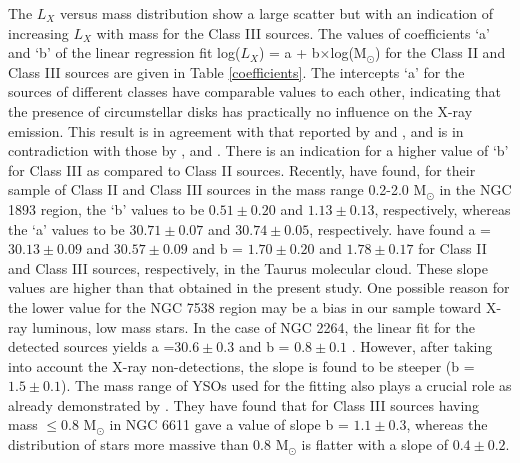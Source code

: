 \documentclass[a4paper,fleqn,usenatbib,useAMS]{mnras}
\begin{document}
The $L_X$ versus mass distribution show a large scatter but with  an indication of increasing  
$L_X$ with mass for the Class III sources.
The values of coefficients `a'  and `b'  of the linear regression fit log($L_X$) = a + b$\times$log(M$_\odot$) 
for the Class II and Class III sources are given in Table \ref{coefficients}.
The intercepts `a' for the sources of different classes have comparable
values to each other, indicating that the presence
of circumstellar disks has practically no influence on the X-ray emission.
This result is in agreement with that reported by \citet{2002ApJ...574..258F} and  \citet{2014NewA...29...18P}, 
and is in contradiction with  those by \citet{2001A&A...377..538S}, \citet{2005ApJS..160..401P} and \citet{2007A&A...468..425T}. 
There is  an indication for a higher value of `b' for Class III as compared to Class II sources.
Recently, \citet{2014NewA...29...18P} have found, for their sample of Class II and Class III sources in the mass range 0.2-2.0 M$_\odot$ in the NGC 1893 region,
the `b' values to be $0.51\pm0.20$ and $1.13\pm0.13$, 
respectively, whereas the `a' values to be  $30.71\pm0.07$ and $30.74\pm0.05$, 
respectively.
\citet{2007A&A...468..425T} have found a =  $30.13\pm0.09$ and  $30.57\pm0.09$ and b = $1.70\pm0.20$ and  $1.78\pm0.17$ 
for  Class II and Class III sources, respectively, in the Taurus molecular cloud. 
These slope values are higher than that obtained in the present study.
One possible reason for the lower value for the NGC 7538 region may be a bias in our
sample toward X-ray luminous, low mass stars. 
In the case of NGC 2264, the linear fit for the detected sources yields a =$30.6\pm0.3$ and b = $0.8\pm0.1$ \citep{2007AJ....134..999D}. However,
after taking into account the X-ray non-detections, the slope is found to be steeper (b = $1.5\pm0.1$).
The mass range of YSOs used for the fitting also plays a crucial role as already demonstrated by \citet{2012ApJ...753..117G}.
They have found that for Class III sources having
mass $\leq$0.8 M$_\odot$ in NGC 6611 gave a value of slope b = $1.1\pm0.3$, whereas the distribution of stars more massive
than 0.8 M$_\odot$ is flatter with a slope of $0.4\pm0.2$. 
\end{document}
